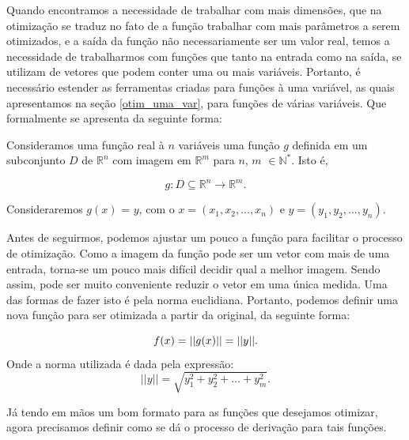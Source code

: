 \hspace{0.8cm}
Quando encontramos a necessidade de trabalhar com mais dimensões, que na
otimização se traduz no fato de a função trabalhar com mais parâmetros a serem
otimizados, e a saída da função não necessariamente ser um valor real,
temos a necessidade de trabalharmos com funções que tanto na entrada como na
saída, se utilizam de vetores que podem conter uma ou mais variáveis. Portanto,
é necessário estender as ferramentas criadas para funções à uma variável, as
quais apresentamos na seção \ref{otim_uma_var}, para funções de várias
variáveis. Que formalmente se apresenta da seguinte forma:

\begin{definition}
    Consideramos uma função real à $n$ variáveis uma função $g$ definida em um
    subconjunto $D$ de \(\mathbb{R}^n\) com imagem em \(\mathbb{R}^m\) para
    $n$, $m$ \(\in \mathbb{N^*}\). Isto é,

    \begin{equation}
            g: D \subseteq \mathbb{R}^n \rightarrow \mathbb{R}^m.
    \end{equation}

    Consideraremos $g(x)$ = $y$, com o $x=(x_1, x_2, ..., x_n)$
    e $y=(y_1, y_2, ..., y_n)$.

\end{definition}



Antes de seguirmos, podemos ajustar um pouco a função para facilitar o processo
de otimização. Como a imagem da função pode ser um vetor com mais de uma
entrada, torna-se um pouco mais difícil decidir qual a melhor imagem. Sendo
assim, pode ser muito conveniente reduzir o vetor em uma única medida. Uma das
formas de fazer isto é pela norma euclidiana. Portanto, podemos definir uma
nova função para ser otimizada a partir da original, da seguinte forma:


\begin{equation}
        f(x) = ||g(x)|| = ||y||.\\
\end{equation}
        Onde a norma utilizada é dada pela expressão:
\begin{equation}
        ||y|| = \sqrt{ y_1^2 + y_2^2 + \hdots + y_m^2}.
\end{equation}

Já tendo em mãos um bom formato para as funções que desejamos otimizar, agora
precisamos definir como se dá o processo de derivação para tais funções.

